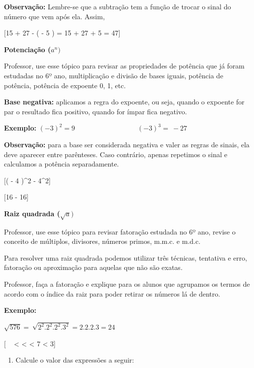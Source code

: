 \textbf{Observação:} Lembre-se que a subtração tem a função de trocar o
sinal do número que vem após ela. Assim,

[15 + 27 - \left( - 5 \right) = 15 + 27 + 5 = 47]

\textbf{Potenciação (}\(a^{n})\)

Professor, use esse tópico para revisar as propriedades de potência que
já foram estudadas no 6º ano, multiplicação e divisão de bases iguais,
potência de potência, potência de expoente 0, 1, etc.

\textbf{Base negativa:} aplicamos a regra do expoente, ou seja, quando o
expoente for par o resultado fica positivo, quando for ímpar fica
negativo.

\textbf{\hfill\break
Exemplo:}
\(\left( - 3 \right)^{2} = 9\ \ \ \ \ \ \ \ \ \ \ \ \ \ \ \ \ \ \ \ \ \ \ \ \ \ \ \ \ \ \ \ \ \ \ \ \ \ \ \ \ \left( - 3 \right)^{3} = \  - 27\ \ \ \ \ \ \ \)

\textbf{Observação:} para a base ser considerada negativa e valer as
regras de sinais, ela deve aparecer entre parênteses. Caso contrário,
apenas repetimos o sinal e calculamos a potência separadamente.

[\left( - 4 \right)^{2} \neq - 4^{2}]

[16 \neq - 16]

\textbf{Raiz quadrada (}\(\sqrt{a})\)

Professor, use esse tópico para revisar fatoração estudada no 6º ano,
revise o conceito de múltiplos, divisores, números primos, m.m.c. e
m.d.c.

Para resolver uma raiz quadrada podemos utilizar três técnicas,
tentativa e erro, fatoração ou aproximação para aquelas que não são
exatas.

Professor, faça a fatoração e explique para os alunos que agrupamos os
termos de acordo com o índice da raiz para poder retirar os números lá
de dentro.

\textbf{Exemplo:}

\(\sqrt{576} = \ \sqrt{2^{2}.2^{2}.2^{2}.3^2} = 2.2.2.3 = 24\)

[ \rightarrow \  <  <   < \sqrt{}7 < 3]



\begin{enumerate}
\def\labelenumi{\arabic{enumi})}
\tightlist
\item
  Calcule o valor das expressões a seguir:
\end{enumerate}

